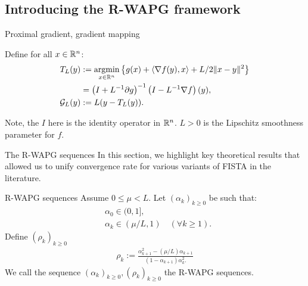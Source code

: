 \documentclass[11pt]{beamer}
\theoremstyle{definition}
\begin{document}
    \subsection{Introducing the R-WAPG framework}
        \begin{frame}{Proximal gradient, gradient mapping}
            \begin{definition}
                Define for all $x\in \mathbb R^n$: 
                \begin{align*}
                    T_L(y) 
                    &:= \mathop{\rm argmin}\limits_{x \in \mathbb R^n} \left\lbrace
                        g(x) + \langle \nabla f(y), x\rangle + L/2\Vert x - y\Vert^2
                    \right\rbrace 
                    \\
                    &= \left(I + L^{-1}\partial g\right)^{-1}
                    \left(I - L^{-1}\nabla f\right)(y),
                    \\
                    \mathcal G_L(y)
                    &:= L(y - T_L(y)).
                \end{align*}
            \end{definition}
            Note, the $I$ here is the identity operator in $\mathbb R^n$. 
            $L > 0$ is the Lipschitz smoothness parameter for $f$. 
        \end{frame}
        \begin{frame}{The R-WAPG sequences}
            In this section, we highlight key theoretical results that allowed us to unify convergence rate for various variants of FISTA in the literature.
            \begin{definition}{R-WAPG sequences}\label{def:rwapg-seq}
                Assume $0 \le \mu < L$. 
                Let $(\alpha_k)_{k \ge 0}$ be such that: 
                \begin{align*}
                    & \alpha_0 \in (0, 1], \\
                    & \alpha_k \in (\mu/L, 1) \quad (\forall k \ge 1). 
                \end{align*}    
                Define $(\rho_k)_{k \ge 0}$
                \begin{align*}
                    \rho_k := \frac{\alpha_{k + 1}^2 - (\mu/L) \alpha_{k + 1}}{
                        (1 - \alpha_{k + 1}) \alpha_k^2.
                    }
                \end{align*}
                We call the sequence $(\alpha_k)_{k \ge 0}, (\rho_k)_{k \ge0}$ the R-WAPG sequences. 
            \end{definition}
        \end{frame}
\end{document}
